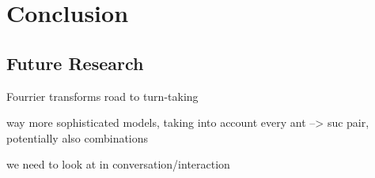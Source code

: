 

\chapter{Conclusion}
\label{ch:conclusion}
\section{Future Research}
\label{sec:conclusionfuture}
Fourrier transforms
road to turn-taking

way more sophisticated models, taking into account every ant --> suc pair, potentially also combinations

we need to look at \rt in conversation/interaction
